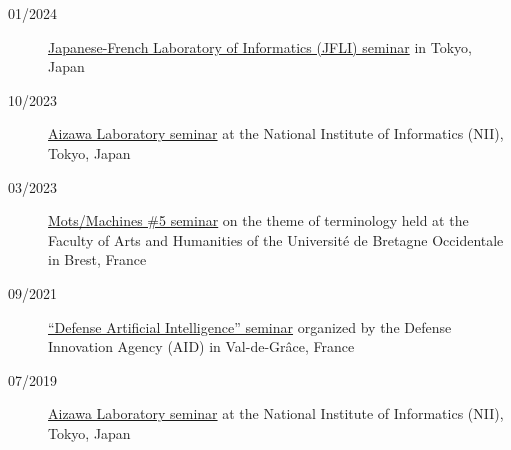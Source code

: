 \begin{description}

    \item[01/2024] \href{https://jfli.cnrs.fr/events.html}{Japanese-French Laboratory of Informatics (JFLI) seminar} in Tokyo, Japan

    \item[10/2023] \href{https://www-al.nii.ac.jp/en/2251-2/}{Aizawa Laboratory seminar} at the National Institute of Informatics (NII), Tokyo, Japan

    \item[03/2023] \href{https://motsmachines.github.io/2023/fr/}{Mots/Machines \#5 seminar} on the theme of terminology held at the Faculty of Arts and Humanities of the Université de Bretagne Occidentale in Brest, France

    \item[09/2021] \href{https://www.defense.gouv.fr/aid/actualites/communaute-dintelligence-artificielle-du-ministere-armees-reunie-2-jours}{``Defense Artificial Intelligence'' seminar} organized by the Defense Innovation Agency (AID) in Val-de-Grâce, France

    \item[07/2019] \href{https://www-al.nii.ac.jp/en/seminar-talk-by-prof-florian-boudin/}{Aizawa Laboratory seminar} at the National Institute of Informatics (NII), Tokyo, Japan
    
\end{description}